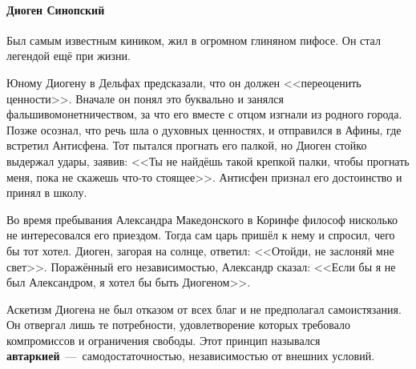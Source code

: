 \paragraph{Диоген Синопский} Был самым известным киником, жил в огромном глиняном пифосе. Он стал легендой ещё при жизни.

Юному Диогену в Дельфах предсказали, что он должен <<переоценить ценности>>. Вначале он понял это буквально и занялся фальшивомонетничеством, за что его вместе с отцом изгнали из родного города. Позже осознал, что речь шла о духовных ценностях, и отправился в Афины, где встретил Антисфена. Тот пытался прогнать его палкой, но Диоген стойко выдержал удары, заявив: <<Ты не найдёшь такой крепкой палки, чтобы прогнать меня, пока не скажешь что-то стоящее>>. Антисфен признал его достоинство и принял в школу.

Во время пребывания Александра Македонского в Коринфе философ нисколько не интересовался его приездом. Тогда сам царь пришёл к нему и спросил, чего бы тот хотел. Диоген, загорая на солнце, ответил: <<Отойди, не заслоняй мне свет>>. Поражённый его независимостью, Александр сказал: <<Если бы я не был Александром, я хотел бы быть Диогеном>>.

Аскетизм Диогена не был отказом от всех благ и не предполагал самоистязания. Он отвергал лишь те потребности, удовлетворение которых требовало компромиссов и ограничения свободы. Этот принцип назывался \textbf{автаркией}~---~самодостаточностью, независимостью от внешних условий.


